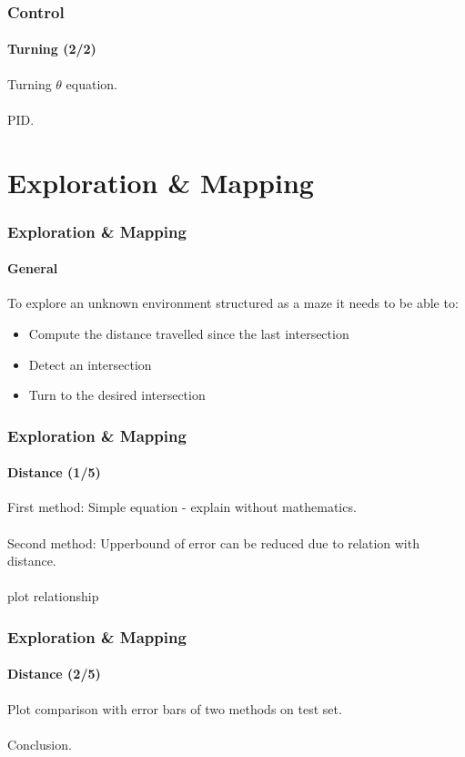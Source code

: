 \documentclass{beamer}
\begin{document}

\begin{frame}
\frametitle{Control}
\framesubtitle{Turning (2/2)}
Turning $\theta$ equation.\\~\\
PID. 
\end{frame}


\section{Exploration \& Mapping} 


\begin{frame}
\frametitle{Exploration \& Mapping}
\framesubtitle{General}
To explore an unknown environment structured as a maze it needs to be able to:
\begin{itemize}
\item Compute the distance travelled since the last intersection
\item Detect an intersection
\item Turn to the desired intersection
\end{itemize}
\end{frame}


\begin{frame}
\frametitle{Exploration \& Mapping}
\framesubtitle{Distance (1/5)}
First method: Simple equation - explain without mathematics.\\~\\
Second method: Upperbound of error can be reduced due to relation with distance.\\~\\
plot relationship
\end{frame}


\begin{frame}
\frametitle{Exploration \& Mapping}
\framesubtitle{Distance (2/5)}
Plot comparison with error bars of two methods on test set.\\~\\
Conclusion.
\end{frame}

\end{document}
